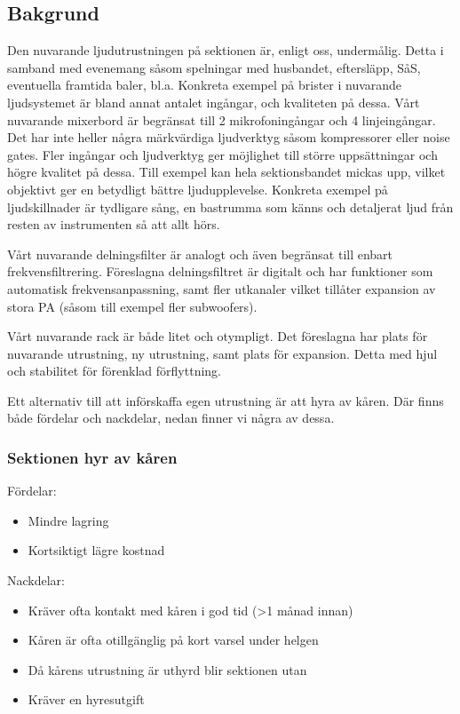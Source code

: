 \documentclass[../_main/handlingar.tex]{subfiles}
\begin{document}

\subsection*{Bakgrund}
    Den nuvarande ljudutrustningen på sektionen är, enligt oss, undermålig. Detta i samband med evenemang såsom spelningar med husbandet, eftersläpp, SåS, eventuella framtida baler, bl.a. 
    Konkreta exempel på brister i nuvarande ljudsystemet är bland annat antalet ingångar, och kvaliteten på dessa. Vårt nuvarande mixerbord är begränsat till 2 mikrofoningångar och 4 linjeingångar. Det har inte heller några märkvärdiga ljudverktyg såsom kompressorer eller noise gates. Fler ingångar och ljudverktyg ger möjlighet till större uppsättningar och högre kvalitet på dessa. Till exempel kan hela sektionsbandet mickas upp, vilket objektivt ger en betydligt bättre ljudupplevelse. Konkreta exempel på ljudskillnader är tydligare sång, en bastrumma som känns och detaljerat ljud från resten av instrumenten så att allt hörs. 
    
    Vårt nuvarande delningsfilter är analogt och även begränsat till enbart frekvensfiltrering. Föreslagna delningsfiltret är digitalt och har funktioner som automatisk frekvensanpassning, samt fler utkanaler vilket tillåter expansion av stora PA (såsom till exempel fler subwoofers).
    
    Vårt nuvarande rack är både litet och otympligt. Det föreslagna har plats för nuvarande utrustning, ny utrustning, samt plats för expansion. Detta med hjul och stabilitet för förenklad förflyttning. 
   
   Ett alternativ till att införskaffa egen utrustning är att hyra av kåren. Där finns både fördelar och nackdelar, nedan finner vi några av dessa. 
   
   \subsubsection*{Sektionen hyr av kåren}
   Fördelar: 
    \begin{itemize}
        \item Mindre lagring
        \item Kortsiktigt lägre kostnad
    \end{itemize}

    Nackdelar: 
    \begin{itemize}
        \item Kräver ofta kontakt med kåren i god tid (>1 månad innan)
        \item Kåren är ofta otillgänglig på kort varsel under helgen
        \item Då kårens utrustning är uthyrd blir sektionen utan
        \item Kräver en hyresutgift
    \end{itemize}
   
\end{document}
